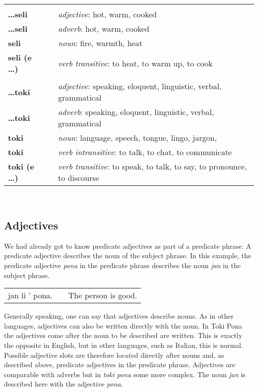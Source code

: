 \begin{supertabular}{p{2,5cm}|ll}
 && \\ %
\textbf{\dots seli} && \textit{adjective}: hot, warm, cooked \\ %
\textbf{\dots seli} && \textit{adverb}: hot, warm, cooked \\ %
\textbf{seli} && \textit{noun}: fire, warmth, heat \\ %
\textbf{seli (e \dots)} && \textit{verb transitive}: to heat, to warm up, to cook \\ %
 && \\ %
\textbf{\dots toki} && \textit{adjective}: speaking, eloquent, linguistic, verbal, grammatical \\ %
\textbf{\dots toki} && \textit{adverb}: speaking, eloquent, linguistic, verbal, grammatical \\ %
\textbf{toki} && \textit{noun}: language, speech, tongue, lingo, jargon, \\ %
\textbf{toki} && \textit{verb intransitive}: to talk, to chat, to communicate \\ %
\textbf{toki (e \dots)} && \textit{verb transitive}: to speak, to talk, to say, to pronounce, to discourse \\ %
\end{supertabular} \\
% 
\newpage
{}
\subsection*{Adjectives}

We had already got to know predicate adjectives as part of a predicate phrase. 
A predicate adjective describes the noun of the subject phrase.
In this example, the predicate adjective \textit{pona} in the predicate phrase describes the noun \textit{jan} in the subject phrase.

\begin{supertabular}{p{5,5cm}|ll}
jan li ' pona. &&  The person is good. \\
\end{supertabular} 

Generally speaking, one can say that adjectives describe nouns. 
As in other languages, adjectives can also be written directly with the noun. 
In Toki Pona the adjectives come after the noun to be described are written. 
This is exactly the opposite in English, but in other languages, such as Italian, this is normal.
Possible adjective slots are therefore located directly after nouns and, as described above, predicate adjectives in the predicate phrase. 
Adjectives are comparable with adverbs but in \textit{toki pona} some more complex.
The noun \textit{jan} is described here with the adjective \textit{pona}.

